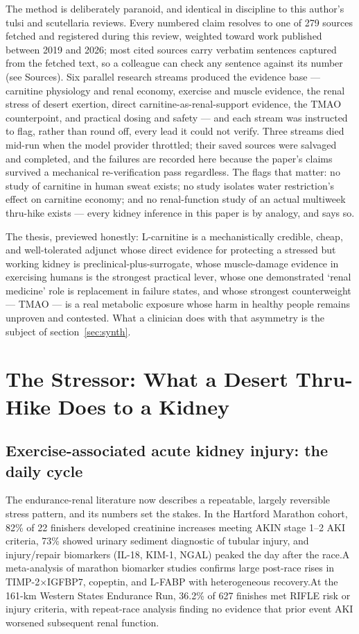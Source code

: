 \documentclass[11pt]{article}
\newcommand{\src}[1]{\allowbreak[#1]}
\begin{document}
The method is deliberately paranoid, and identical in discipline to this author's tulsi and scutellaria reviews. Every numbered claim resolves to one of 279 sources fetched and registered during this review, weighted toward work published between 2019 and 2026; most cited sources carry verbatim sentences captured from the fetched text, so a colleague can check any sentence against its number (see Sources). Six parallel research streams produced the evidence base --- carnitine physiology and renal economy, exercise and muscle evidence, the renal stress of desert exertion, direct carnitine-as-renal-support evidence, the TMAO counterpoint, and practical dosing and safety --- and each stream was instructed to flag, rather than round off, every lead it could not verify. Three streams died mid-run when the model provider throttled; their saved sources were salvaged and completed, and the failures are recorded here because the paper's claims survived a mechanical re-verification pass regardless. The flags that matter: no study of carnitine in human sweat exists; no study isolates water restriction's effect on carnitine economy; and no renal-function study of an actual multiweek thru-hike exists --- every kidney inference in this paper is by analogy, and says so.

The thesis, previewed honestly: L-carnitine is a mechanistically credible, cheap, and well-tolerated adjunct whose direct evidence for protecting a stressed but working kidney is preclinical-plus-surrogate, whose muscle-damage evidence in exercising humans is the strongest practical lever, whose one demonstrated `renal medicine' role is replacement in failure states, and whose strongest counterweight --- TMAO --- is a real metabolic exposure whose harm in healthy people remains unproven and contested. What a clinician does with that asymmetry is the subject of section~\ref{sec:synth}.

\section{The Stressor: What a Desert Thru-Hike Does to a Kidney}
\label{sec:stressor}

\subsection{Exercise-associated acute kidney injury: the daily cycle}

The endurance-renal literature now describes a repeatable, largely reversible stress pattern, and its numbers set the stakes. In the Hartford Marathon cohort, 82\% of 22 finishers developed creatinine increases meeting AKIN stage 1--2 AKI criteria, 73\% showed urinary sediment diagnostic of tubular injury, and injury/repair biomarkers (IL-18, KIM-1, NGAL) peaked the day after the race.\src{163} A meta-analysis of marathon biomarker studies confirms large post-race rises in TIMP-2$\times$IGFBP7, copeptin, and L-FABP with heterogeneous recovery.\src{166} At the 161-km Western States Endurance Run, 36.2\% of 627 finishes met RIFLE risk or injury criteria, with repeat-race analysis finding no evidence that prior event AKI worsened subsequent renal function.\src{164}
\end{document}
